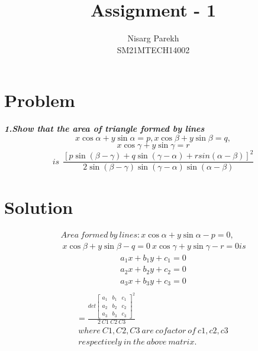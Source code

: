 \documentclass[journal,12pt,twocolumn]{IEEEtran}
\begin{document}
\providecommand{\sbrak}[1]{\ensuremath{{}\left[#1\right]}}
\providecommand{\lsbrak}[1]{\ensuremath{{}\left[#1\right.}}
\providecommand{\rsbrak}[1]{\ensuremath{{}\left.#1\right]}}
\providecommand{\brak}[1]{\ensuremath{\left(#1\right)}}
\providecommand{\lbrak}[1]{\ensuremath{\left(#1\right.}}
\providecommand{\rbrak}[1]{\ensuremath{\left.#1\right)}}
\providecommand{\cbrak}[1]{\ensuremath{\left\{#1\right\}}}
\providecommand{\lcbrak}[1]{\ensuremath{\left\{#1\right.}}
\providecommand{\rcbrak}[1]{\ensuremath{\left.#1\right\}}}
\newcommand{\myvec}[1]{\ensuremath{\begin{pmatrix}#1\end{pmatrix}}}
\newcommand{\cmyvec}[1]{\ensuremath{\begin{pmatrix*}[c]#1\end{pmatrix*}}}
\newcommand{\mydet}[1]{\ensuremath{\begin{vmatrix}#1\end{vmatrix}}}
\newcommand{\proj}[2]{\textbf{proj}_{\vec{#1}}\vec{#2}}
\let\StandardTheFigure\thefigure
\let\vec\mathbf

\title{
Assignment - 1
}
\author{ Nisarg Parekh \\SM21MTECH14002}
\maketitle
\newpage
\bigskip

\section*{\textbf{Problem}}
\noindent
\textbf{\textsl{1.Show that the area of triangle formed by lines
$$x\cos\alpha + y\sin\alpha =p,x\cos\beta + y\sin\beta =q,$$$$x\cos\gamma + y\sin\gamma =r$$
 $$is~~\frac{\left[ p\sin(\beta-\gamma) +q\sin(\gamma-\alpha)+r sin(\alpha-\beta)\right]^2 }{2\sin(\beta-\gamma) \sin(\gamma-\alpha)\sin(\alpha-\beta)}$$ 
 }}
\noindent
\section*{\textbf{Solution}}
\noindent
\begin{align*}
 Area ~formed~ by~ lines:   x\cos\alpha + y\sin\alpha -p=0, \\~x\cos\beta + y\sin\beta -q=0~x\cos\gamma + y\sin\gamma -r=0 is 
\end{align*}
\begin{multline*}
     a_{1}x + b_{1}y +c_{1}=0 \\
    a_{2}x + b_{2}y +c_{2}=0 \\
    a_{3}x + b_{3}y +c_{3}=0 \\
\end{multline*}
\begin{multline}
     =\frac{det \begin{bmatrix}a_{1}&b_{1}&c_{1}\\a_{2}&b_{2}&c_{2}\\a_{3}&b_{3}&c_{3}\end{bmatrix}^{2}}{2~C1~C2~C3}\\\
where ~C1,C2,C3~ are~ co factor ~of~ c1,c2,c3 ~\\\ respectively~ in~ the ~above~ matrix.
\end{multline}
\end{document}
